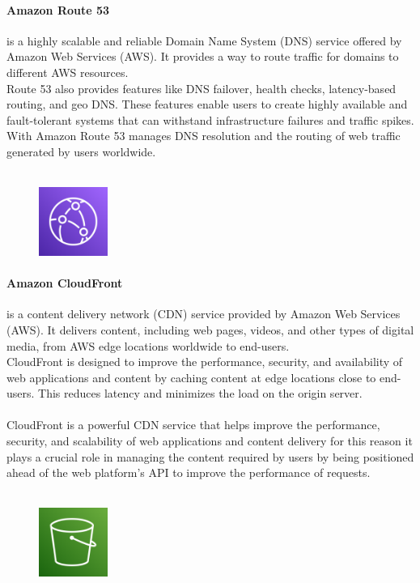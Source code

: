 \documentclass[a4paper,12pt]{report}
\begin{document}
\paragraph{Amazon Route 53} is a highly scalable and reliable Domain Name System (DNS) service offered by Amazon Web Services (AWS). It provides a way to route traffic for domains to different AWS resources.\\
Route 53 also provides features like DNS failover, health checks, latency-based routing, and geo DNS. These features enable users to create highly available and fault-tolerant systems that can withstand infrastructure failures and traffic spikes.\\
With Amazon Route 53 manages DNS resolution and the routing of web traffic generated by users worldwide.\\\\
%
%
%
\begin{figure}
  \centering
  \includegraphics[width=0.2\textwidth]{img/services/CloudFront}
\end{figure}
%
\paragraph{Amazon CloudFront} is a content delivery network (CDN) service provided by Amazon Web Services (AWS). It delivers content, including web pages, videos, and other types of digital media, from AWS edge locations worldwide to end-users.\\
CloudFront is designed to improve the performance, security, and availability of web applications and content by caching content at edge locations close to end-users. This reduces latency and minimizes the load on the origin server.\\\\
CloudFront is a powerful CDN service that helps improve the performance, security, and scalability of web applications and content delivery for this reason it plays a crucial role in managing the content required by users by being positioned ahead of the web platform's API to improve the performance of requests.\\\\
%
%
%
\begin{figure}
  \centering
  \includegraphics[width=0.2\textwidth]{img/services/S3}
\end{figure}
%
\end{document}
